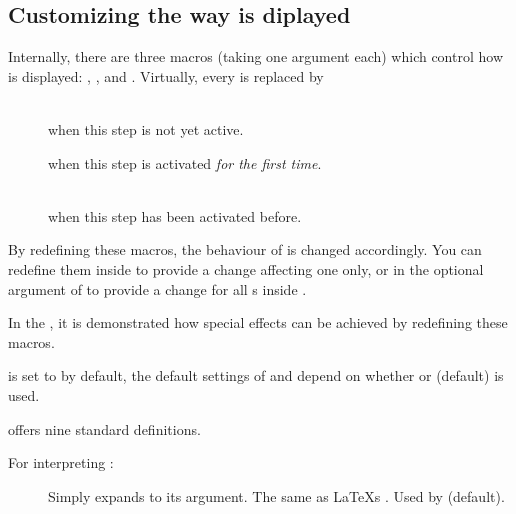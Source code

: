 \begin{slide}
  \subsection{Customizing the way  is diplayed}\label{Sec:displaycustom}%
  Internally, there are three macros (taking one argument each) which control how  is displayed:
  ,
  , and
  . Virtually, every
   is replaced by
  \begin{description}
  \item[]\mbox{}\\ when this step is not yet active.
  \item[] when this step is
    activated \emph{for the first time}.
  \item[]\mbox{}\\
    when this step has been activated before.
  \end{description}

  By redefining these macros, the behaviour of  is changed accordingly. You can redefine them inside
   to provide a change affecting one  only, or in the optional argument of
   to provide a change for all s inside .

  In the , it is demonstrated how special effects can be achieved by redefining these macros.

   is set to  by default, the default settings of
   and  depend on whether  or
   (default) is used.

  \newslide

   offers nine standard definitions.

  For interpreting :
  \begin{description}
  \item[]
    Simply expands to its argument. The same as \LaTeX s
    . Used by  (default).


\end{description}
\end{slide}
